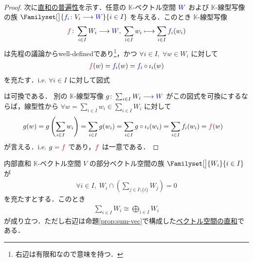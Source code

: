 \documentclass[rep_main]{subfiles}
\begin{document}
\begin{proof}
    次に\hyperref[def:univ-vec-sum]{直和の普遍性}を示す．任意の $\mathbb{K}$-ベクトル空間 $\textcolor{blue}{W}$ および $\mathbb{K}$-線型写像の族 $\Familyset[\big]{\textcolor{blue}{f_i} \colon V_i \lto \textcolor{blue}{W}}{i \in I}$ を与える．このとき
    $\mathbb{K}$-線型写像
    \begin{align}
        \textcolor{red}{f} \colon \sum_{i \in I} W_i \longrightarrow \textcolor{blue}{W},\; \sum_{i \in I} w_i \longmapsto \sum_{i \in I} \textcolor{blue}{f_i} (w_i)
    \end{align}
    は先程の議論からwell-definedであり\footnote{右辺は有限和なので意味を持つ．}，かつ $\forall i \in I,\; \forall w \in W_i$ に対して 
    \begin{align}
        \textcolor{red}{f}(w) = \textcolor{blue}{f_i} (w) = \textcolor{blue}{f_i} \circ \iota_i (w)
    \end{align}
    を充たす．i.e. $\forall i \in I$ に対して図式
    \begin{center}
    \end{center}
    は可換である．
    別の $\mathbb{K}$-線型写像 $g \colon \sum_{i \in I} W_i \longrightarrow \textcolor{blue}{W}$ がこの図式を可換にするならば，線型性から $\forall w = \sum_{i \in I} w_i \in \sum_{i \in I} W_i$ に対して
    \begin{align}
        g(w) &= g \left( \sum_{i \in I} w_i \right) = \sum_{i \in I} g(w_i) = \sum_{i \in I} g \circ \iota_i (w_i) = \sum_{i \in I} \textcolor{blue}{f_i}(w_i) = \textcolor{red}{f}(w)
    \end{align}
    が言える．i.e. $g = \textcolor{red}{f}$ であり，$\textcolor{red}{f}$ は一意である．
\end{proof}

\begin{mycol}[label=col:subvec-directsum]{内部直和}
    $\mathbb{K}$-ベクトル空間 $V$ の部分ベクトル空間の族 $\Familyset[\big]{W_i}{i \in I}$ が
    \begin{align}
        \forall i \in I,\; W_i \cap \left(\sum_{j \in I \setminus \{i\}} W_j\right) = 0
    \end{align}
    を充たすとする．このとき
    \begin{align}
        \sum_{i \in I} W_i \cong \bigoplus_{i \in I} W_i
    \end{align}
    が成り立つ．ただし右辺は命題\ref{prop:sum-vec}で構成した\hyperref[def:univ-vec-sum]{ベクトル空間の直和}である．
\end{mycol}
\end{document}
